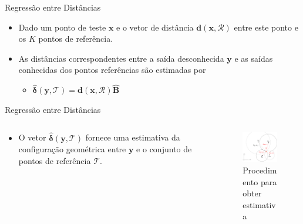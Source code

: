 \documentclass{beamer}
\begin{document}

\begin{frame}{Regressão entre Distâncias}
	\begin{itemize}
	    \item Dado um ponto de teste $\mathbf{x}$ e o vetor de distância  $\mathbf{d}(\mathbf{x}, \mathcal{R})$ entre este ponto e os $K$ pontos de referência.
	    \item As distâncias correspondentes entre a saída desconhecida $\mathbf{y}$ e as saídas conhecidas dos pontos referências são estimadas por
	    \begin{itemize}[]
	    	\item[] $\boldsymbol{\widehat{\delta}}(\mathbf{y}, \mathcal{T}) = \mathbf{d}(\mathbf{x}, \mathcal{R})\mathbf{ \widehat{B}}$
	    \end{itemize}
	\end{itemize}
\end{frame}


\begin{frame}{Regressão entre Distâncias}

\begin{minipage}[0.2\textheight]{\textwidth}
	\begin{columns}[T]
	\begin{column}{0.6\textwidth}
		\begin{itemize}
			\item O vetor $ \boldsymbol{\widehat{\delta}}(\mathbf{y}, \mathcal{T}) $ fornece uma estimativa da configuração geométrica entre $ \mathbf{y} $ e o conjunto de pontos de referência $ \mathcal{T} $.
		\end{itemize}
	\end{column}
	
	\begin{column}{0.4\textwidth}
		\begin{figure}[!ht]
		\centering
		\includegraphics[width=45mm,scale=.35]{output_estimation.eps}
		\caption{Procedimento para obter estimativa}
		\end{figure}	\end{column}
	\end{columns}
	
\end{minipage}

\end{frame}
\end{document}
